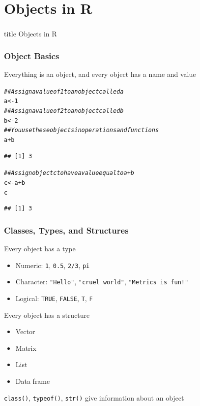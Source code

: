 \documentclass{beamer}\usepackage[]{graphicx}\usepackage[]{xcolor}
\makeatletter
\newcommand{\hlnum}[1]{\textcolor[rgb]{0.686,0.059,0.569}{#1}}%
\newcommand{\hlcom}[1]{\textcolor[rgb]{0.678,0.584,0.686}{\textit{#1}}}%
\newcommand{\hlopt}[1]{\textcolor[rgb]{0,0,0}{#1}}%
\newcommand{\hlstd}[1]{\textcolor[rgb]{0.345,0.345,0.345}{#1}}%
\newcommand{\hlkwb}[1]{\textcolor[rgb]{0.69,0.353,0.396}{#1}}%
\newenvironment{kframe}{%
 \def\at@end@of@kframe{}%
 \ifinner\ifhmode%
  \def\at@end@of@kframe{\end{minipage}}%
  \begin{minipage}{\columnwidth}%
 \fi\fi%
 \def\FrameCommand##1{\hskip\@totalleftmargin \hskip-\fboxsep
 \colorbox{shadecolor}{##1}\hskip-\fboxsep
     \hskip-\linewidth \hskip-\@totalleftmargin \hskip\columnwidth}%
 \MakeFramed {\advance\hsize-\width
   \@totalleftmargin\z@ \linewidth\hsize
   \@setminipage}}%
 {\par\unskip\endMakeFramed%
 \at@end@of@kframe}
\newenvironment{knitrout}{}{} %
\makeatother
\begin{document}
\section{Objects in R}
\label{objects}
\begin{frame}\frametitle{}
    \vfill
    \centering
    \begin{beamercolorbox}[center]{title}
        \Large Objects in R
    \end{beamercolorbox}
    \vfill
\end{frame}

\begin{frame}[fragile]\frametitle{Object Basics}
    Everything is an object, and every object has a name and value
\begin{knitrout}\footnotesize
{}\color{fgcolor}\begin{kframe}
\begin{alltt}
\hlcom{## Assign a value of 1 to an object called a}
\hlstd{a} \hlkwb{<-} \hlnum{1}
\hlcom{## Assign a value of 2 to an object called b}
\hlstd{b} \hlkwb{<-} \hlnum{2}
\hlcom{## You use these objects in operations and functions}
\hlstd{a} \hlopt{+} \hlstd{b}
\end{alltt}
\begin{verbatim}
## [1] 3
\end{verbatim}
\begin{alltt}
\hlcom{## Assign object c to have a value equal to a + b}
\hlstd{c} \hlkwb{<-} \hlstd{a} \hlopt{+} \hlstd{b}
\hlstd{c}
\end{alltt}
\begin{verbatim}
## [1] 3
\end{verbatim}
\end{kframe}
\end{knitrout}
\end{frame}

\begin{frame}\frametitle{Classes, Types, and Structures}
    Every object has a type
    \begin{itemize}
        \item Numeric: \texttt{1}, \texttt{0.5}, \texttt{2/3}, \texttt{pi}
        \item Character: \texttt{"Hello"}, \texttt{"cruel world"}, \texttt{"Metrics is fun!"}
        \item Logical: \texttt{TRUE}, \texttt{FALSE}, \texttt{T}, \texttt{F}
    \end{itemize}
    \vspace{2ex}
    Every object has a structure
    \begin{itemize}
        \item Vector
        \item Matrix
        \item List
        \item Data frame
    \end{itemize}
    \vspace{2ex}
    \texttt{class()}, \texttt{typeof()}, \texttt{str()} give information about an object
\end{frame}
\end{document}
